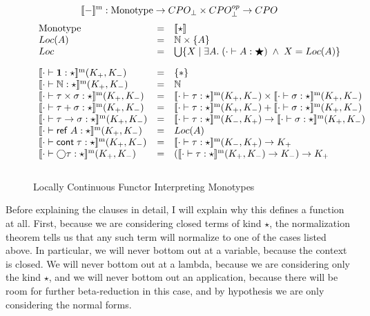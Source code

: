 \begin{figure}
\begin{displaymath}
[\![{-}]\!]^{\mathrm{m}} : \mbox{Monotype} \to CPO_\bot \times CPO^{op}_\bot \to CPO   
\end{displaymath}
\begin{displaymath}
\begin{array}{lcl}
\mbox{Monotype} & = & \interp{\star} \\
Loc(A) & = & \N \times \setof{A} \\
Loc    & = & \bigcup \setof{X \;|\; \exists A.\; (\judgeWK[\cdot]{A}{\bigstar}) \;\land\;X = Loc(A)} \\[1em]

\interpmono{\judgeWK[\cdot]{\unittype}{\star}}(K_+, K_-) & = & \setof{*} \\

\interpmono{\judgeWK[\cdot]{\N}{\star}}(K_+, K_-) & = &  \N \\

\interpmono{\judgeWK[\cdot]{\tau \times \sigma}{\star}}(K_+, K_-) & = & 
  \interpmono{\judgeWK[\cdot]{\tau}{\star}}(K_+, K_-) \times 
  \interpmono{\judgeWK[\cdot]{\sigma}{\star}}(K_+, K_-) \\

\interpmono{\judgeWK[\cdot]{\tau + \sigma}{\star}}(K_+, K_-) & = & 
  \interpmono{\judgeWK[\cdot]{\tau}{\star}}(K_+, K_-) + 
  \interpmono{\judgeWK[\cdot]{\sigma}{\star}}(K_+, K_-) \\


\interpmono{\judgeWK[\cdot]{\tau \to \sigma}{\star}}(K_+, K_-) & = & 
  \interpmono{\judgeWK[\cdot]{\tau}{\star}}(K_-, K_+) \to
  \interpmono{\judgeWK[\cdot]{\sigma}{\star}}(K_+, K_-) \\

\interpmono{\judgeWK[\cdot]{\reftype{A}}{\star}}(K_+, K_-) & = & Loc(A) \\

\interpmono{\judgeWK[\cdot]{\cont{\tau}}{\star}}(K_+, K_-) & = & 
    \interpmono{\judgeWK[\cdot]{\tau}{\star}}(K_-,K_+) \to K_+ \\

\interpmono{\judgeWK[\cdot]{\monad{\tau}}{\star}}(K_+, K_-) & = & 
   (\interpmono{\judgeWK[\cdot]{\tau}{\star}}(K_+, K_-) \to K_-) \to K_+ \\[1em]
\end{array}
\end{displaymath}
\caption{Locally Continuous Functor Interpreting Monotypes}
\label{interp-monotypes}
\end{figure}
Before explaining the clauses in detail, I will explain why this
defines a function at all. First, because we are considering closed
terms of kind $\star$, the normalization theorem tells us that any
such term will normalize to one of the cases listed above. In
particular, we will never bottom out at a variable, because the
context is closed. We will never bottom out at a lambda, because we
are considering only the kind $\star$, and we will never bottom out an
application, because there will be room for further beta-reduction in
this case, and by hypothesis we are only considering the normal forms.

